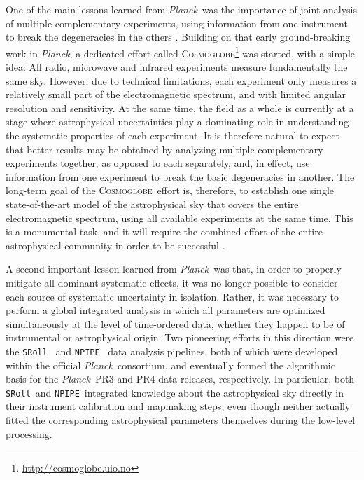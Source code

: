 \documentclass{aa}
\def\Cosmoglobe{\textsc{Cosmoglobe}}
\def\Planck{\textit{Planck}}
\newcommand{\npipe}[0]{\texttt{NPIPE}}
\newcommand{\sroll}[0]{\texttt{SRoll}}
\begin{document}
One of the main lessons learned from \Planck\ was the importance of joint analysis of multiple complementary experiments, using information from one instrument to break the degeneracies in the others \citep[e.g.,][]{planck2014-a12}. Building on that early ground-breaking work in \Planck, a dedicated effort called \Cosmoglobe\footnote{\url{http://cosmoglobe.uio.no}} was started, with a simple idea: All radio, microwave and infrared experiments measure fundamentally the same sky. However, due to technical limitations, each experiment only measures a relatively small part of the electromagnetic spectrum, and with limited angular resolution and sensitivity. At the same time, the field as a whole is currently at a stage where astrophysical uncertainties play a dominating role in understanding the systematic properties of each experiment. It is therefore natural to expect that better results may be obtained by analyzing multiple complementary experiments together, as opposed to each separately, and, in effect, use information from one experiment to break the basic degeneracies in another. The long-term goal of the \Cosmoglobe\ effort is, therefore, to establish one single state-of-the-art model of the astrophysical sky that covers the entire electromagnetic spectrum, using all available experiments at the same time. This is a monumental task, and it will require the combined effort of the entire astrophysical community in order to be successful \citep{bp05}. 

A second important lesson learned from \Planck\ was that, in order to properly mitigate all dominant systematic effects, it was no longer possible to consider each source of systematic uncertainty in isolation. Rather, it was necessary to perform a global integrated analysis in which all parameters are optimized simultaneously at the level of time-ordered data, whether they happen to be of instrumental or astrophysical origin. Two pioneering efforts in this direction were the \sroll\ \citep{sroll2} and \npipe\ \citep{npipe} data analysis pipelines, both of which were developed within the official \Planck\ consortium, and eventually formed the algorithmic basis for the \Planck\ PR3 \citep{planck2016-l01} and PR4 \citep{npipe} data releases, respectively. In particular, both \sroll\ and \npipe\ integrated knowledge about the astrophysical sky directly in their instrument calibration and mapmaking steps, even though neither actually fitted the corresponding astrophysical parameters themselves  during the low-level processing.
\end{document}
